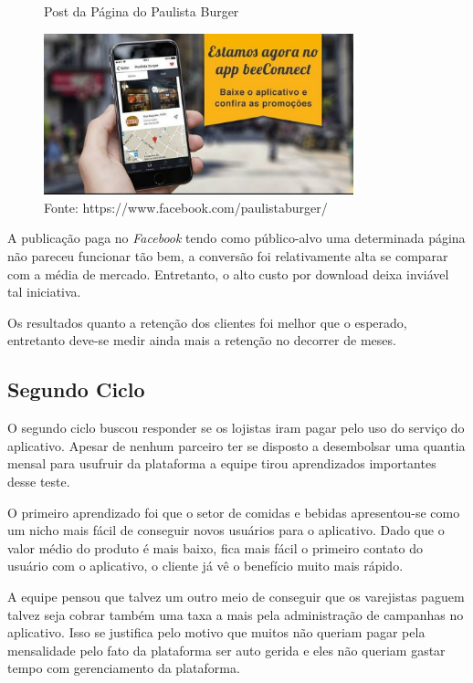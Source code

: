 \begin{figure}[H]
\caption{Post da Página do Paulista Burger}
\centerline{\includegraphics[width=0.8\textwidth]{img/paulista_burger}}
\label{fig:paulista_burger}
\caption* {Fonte: https://www.facebook.com/paulistaburger/}
\end{figure}

A publicação paga no \textit{Facebook} tendo como público-alvo uma determinada página não pareceu funcionar tão bem, a conversão foi relativamente alta se comparar com a média de mercado. Entretanto, o alto custo por download deixa inviável tal iniciativa.

Os resultados quanto a retenção dos clientes foi melhor que o esperado, entretanto deve-se medir ainda mais a retenção no decorrer de meses.

\subsection{Segundo Ciclo}
\label{cha:segundo_ciclo}
O segundo ciclo buscou responder se os lojistas iram pagar pelo uso do serviço do aplicativo. Apesar de nenhum parceiro ter se disposto a desembolsar uma quantia mensal para usufruir da plataforma a equipe tirou aprendizados importantes desse teste.

O primeiro aprendizado foi que o setor de comidas e bebidas apresentou-se como um nicho mais fácil de conseguir novos usuários para o aplicativo. Dado que o valor médio do produto é mais baixo, fica mais fácil o primeiro contato do usuário com o aplicativo, o cliente já vê o benefício muito mais rápido.

A equipe pensou que talvez um outro meio de conseguir que os varejistas paguem talvez seja cobrar também uma taxa a mais pela administração de campanhas no aplicativo. Isso se justifica pelo motivo que muitos não queriam pagar pela mensalidade pelo fato da plataforma ser auto gerida e eles não queriam gastar tempo com gerenciamento da plataforma.

